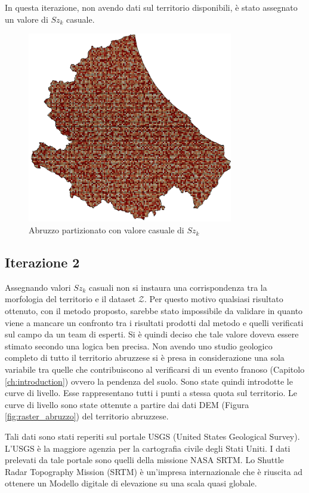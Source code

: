In questa iterazione, non avendo dati sul territorio disponibili, è stato assegnato un valore di \textit{$Sz_k$} casuale. 
\begin{figure}[H]
	\centering
	\includegraphics[width=0.8\textwidth]{images/AbruzzoRandom}
	\caption{Abruzzo partizionato con valore casuale di $Sz_k$}
	\label{fig:abruzzo_random}
\end{figure}


\subsection{\textbf{Iterazione 2}}
Assegnando valori $Sz_k$ casuali non si instaura una corrispondenza tra la morfologia del territorio e il dataset $\mathcal{Z}$. Per questo motivo qualsiasi risultato ottenuto, con il metodo proposto, sarebbe stato impossibile da validare in quanto viene a mancare un confronto tra i risultati prodotti dal metodo e quelli verificati sul campo da un team di esperti.    
Si è quindi deciso che tale valore doveva essere stimato secondo una logica ben precisa.
Non avendo uno studio geologico completo di tutto il territorio abruzzese si è presa in  considerazione una sola variabile tra quelle che contribuiscono al verificarsi di un evento franoso (Capitolo \ref{ch:introduction}) ovvero la pendenza del suolo. 
Sono state quindi introdotte le curve di livello. Esse rappresentano tutti i punti a stessa quota sul territorio. Le curve di livello  sono state ottenute a partire dai dati DEM (Figura \ref{fig:raster_abruzzo}) del territorio abruzzese.

Tali dati sono stati reperiti sul portale USGS (United States Geological Survey). L'USGS è la maggiore agenzia per la cartografia civile degli Stati Uniti. I dati prelevati da tale portale sono quelli della missione NASA SRTM.
Lo Shuttle Radar Topography Mission (SRTM) è un'impresa internazionale che è riuscita ad ottenere un Modello digitale di elevazione su una scala quasi globale. 

